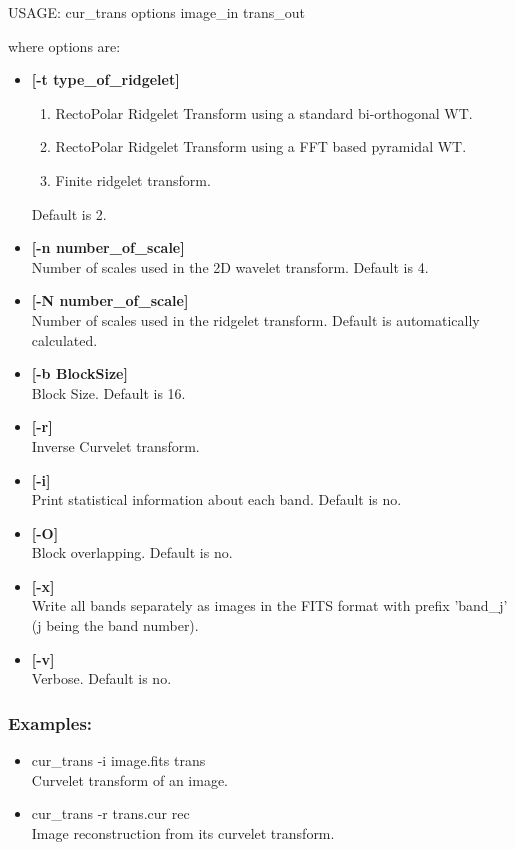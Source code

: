 {\bf
\begin{center}
 USAGE: cur\_trans options image\_in trans\_out
\end{center}}
where options are:
\begin{itemize}
\baselineskip=0.4truecm
\itemsep=0.1truecm
\item {\bf [-t type\_of\_ridgelet]}  
\begin{enumerate}
\baselineskip=0.4truecm
\item RectoPolar Ridgelet Transform using a standard bi-orthogonal WT.
\item RectoPolar Ridgelet Transform using a FFT based pyramidal WT.
\item Finite ridgelet transform.
\end{enumerate}
Default is 2.
\item {\bf [-n number\_of\_scale]} \\
 Number of scales used in the 2D wavelet transform.
 Default is 4. 
\item {\bf [-N number\_of\_scale]} \\
 Number of scales used in the ridgelet transform.
 Default is automatically calculated.
\item {\bf [-b BlockSize]}  \\
Block Size. Default is 16.
\item {\bf [-r]}  \\
Inverse Curvelet transform.
\item {\bf [-i]}  \\
Print statistical information about each band. Default is no. 
\item {\bf [-O]}  \\
 Block overlapping. Default is no. 
\item {\bf [-x]} \\
 Write all bands separately as images in the FITS format with prefix 'band\_j' 
(j being the band number).
\item {\bf [-v]} \\
Verbose. Default is no.
\end{itemize}

\subsubsection*{Examples:}
\begin{itemize}
\item cur\_trans -i image.fits trans\\
Curvelet transform of an image.
\item cur\_trans -r  trans.cur rec\\
Image reconstruction from its curvelet transform.
\end{itemize}


